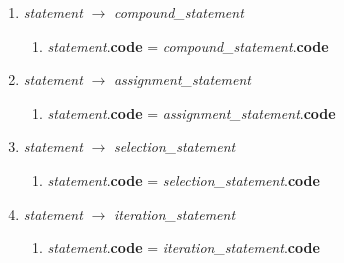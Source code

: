 \documentclass[12pt]{article}
\begin{document}
\begin{enumerate}[label = \arabic*.]
\item \textit{ statement } $\rightarrow$ \textit{ compound\_statement }
\begin{enumerate}[label = \roman*.]
\item \textit{statement}.\textbf{code} = \textit{compound\_statement}.\textbf{code}
\end{enumerate}

\item \textit{ statement } $\rightarrow$ \textit{ assignment\_statement }
\begin{enumerate}[label = \roman*.]
\item \textit{statement}.\textbf{code} = \textit{assignment\_statement}.\textbf{code}
\end{enumerate}

\item \textit{ statement } $\rightarrow$ \textit{ selection\_statement}
\begin{enumerate}[label = \roman*.]
\item \textit{statement}.\textbf{code} = \textit{selection\_statement}.\textbf{code}
\end{enumerate}

\item \textit{ statement } $\rightarrow$ \textit{ iteration\_statement} 
\begin{enumerate}[label = \roman*.]
\item \textit{statement}.\textbf{code} = \textit{iteration\_statement}.\textbf{code}
\end{enumerate}

\end{enumerate}
\end{document}
